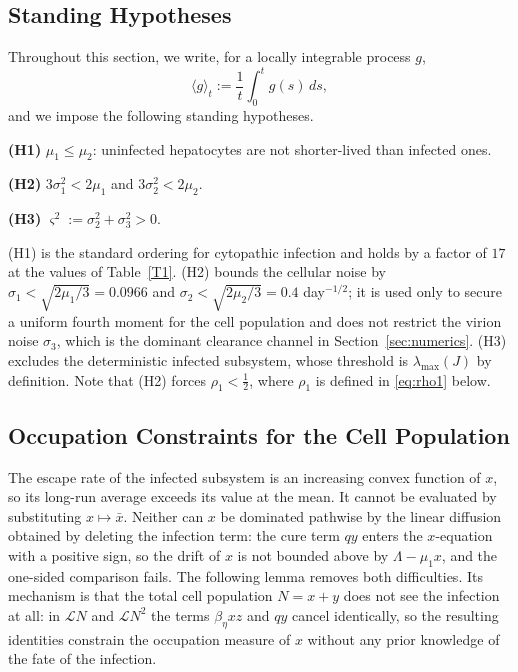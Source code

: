 \documentclass{article}
\newcommand{\betaeta}{\beta_\eta}
\newcommand{\avg}[1]{\big\langle #1 \big\rangle_t}
\begin{document}
\subsection{Standing Hypotheses}

Throughout this section, we write, for a locally integrable process $g$,
\[
\avg{g}:=\frac1t\int_0^t g(s)\,ds ,
\]
and we impose the following standing hypotheses.

\medskip
\noindent\textbf{(H1)} $\mu_1\le\mu_2$: uninfected hepatocytes are not shorter-lived than infected ones.

\noindent\textbf{(H2)} $3\sigma_1^2<2\mu_1$ and $3\sigma_2^2<2\mu_2$.

\noindent\textbf{(H3)} $\varsigma^2:=\sigma_2^2+\sigma_3^2>0$.
\medskip

(H1) is the standard ordering for cytopathic infection and holds by a factor of $17$ at the values of Table~\ref{T1}. (H2) bounds the cellular noise by $\sigma_1<\sqrt{2\mu_1/3}=0.0966$ and $\sigma_2<\sqrt{2\mu_2/3}=0.4$ day$^{-1/2}$; it is used only to secure a uniform fourth moment for the cell population and does not restrict the virion noise $\sigma_3$, which is the dominant clearance channel in Section~\ref{sec:numerics}. (H3) excludes the deterministic infected subsystem, whose threshold is $\lambda_{\max}(J)$ by definition. Note that (H2) forces $\rho_1<\tfrac12$, where $\rho_1$ is defined in \eqref{eq:rho1} below.

\subsection{Occupation Constraints for the Cell Population}

The escape rate of the infected subsystem is an increasing convex function of $x$, so its long-run average exceeds its value at the mean. It cannot be evaluated by substituting $x\mapsto\bar x$. Neither can $x$ be dominated pathwise by the linear diffusion obtained by deleting the infection term: the cure term $qy$ enters the $x$-equation with a positive sign, so the drift of $x$ is not bounded above by $\Lambda-\mu_1x$, and the one-sided comparison fails. The following lemma removes both difficulties. Its mechanism is that the total cell population $N=x+y$ does not see the infection at all: in $\mathcal{L}N$ and $\mathcal{L}N^2$ the terms $\betaeta xz$ and $qy$ cancel identically, so the resulting identities constrain the occupation measure of $x$ without any prior knowledge of the fate of the infection.
\end{document}
